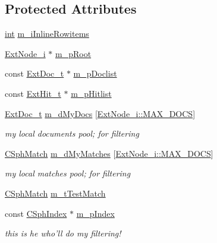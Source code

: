 \subsection*{Protected Attributes}
\begin{DoxyCompactItemize}
\item 
\hyperlink{sphinxexpr_8cpp_a4a26e8f9cb8b736e0c4cbf4d16de985e}{int} \hyperlink{classExtRanker__c_afd1de3f31fb68a71df3c6f3320943ce9}{m\-\_\-i\-Inline\-Rowitems}
\item 
\hyperlink{classExtNode__i}{Ext\-Node\-\_\-i} $\ast$ \hyperlink{classExtRanker__c_a61e8fecdc5c1fce2a4fef58063f846bc}{m\-\_\-p\-Root}
\item 
const \hyperlink{structExtDoc__t}{Ext\-Doc\-\_\-t} $\ast$ \hyperlink{classExtRanker__c_a67c930e6af375b63ab1d12fa0b85df2f}{m\-\_\-p\-Doclist}
\item 
const \hyperlink{structExtHit__t}{Ext\-Hit\-\_\-t} $\ast$ \hyperlink{classExtRanker__c_ac2cd03cfdafd11a55dd190eed8c2b84a}{m\-\_\-p\-Hitlist}
\item 
\hyperlink{structExtDoc__t}{Ext\-Doc\-\_\-t} \hyperlink{classExtRanker__c_ac099a844b02367ca2ed04916d6041372}{m\-\_\-d\-My\-Docs} \mbox{[}\hyperlink{classExtNode__i_afe46dd6ff6757d7a0bf3318fd1462bf9}{Ext\-Node\-\_\-i\-::\-M\-A\-X\-\_\-\-D\-O\-C\-S}\mbox{]}
\begin{DoxyCompactList}\small\item\em my local documents pool; for filtering \end{DoxyCompactList}\item 
\hyperlink{classCSphMatch}{C\-Sph\-Match} \hyperlink{classExtRanker__c_a1392b68deaa7087016c178505864dc89}{m\-\_\-d\-My\-Matches} \mbox{[}\hyperlink{classExtNode__i_afe46dd6ff6757d7a0bf3318fd1462bf9}{Ext\-Node\-\_\-i\-::\-M\-A\-X\-\_\-\-D\-O\-C\-S}\mbox{]}
\begin{DoxyCompactList}\small\item\em my local matches pool; for filtering \end{DoxyCompactList}\item 
\hyperlink{classCSphMatch}{C\-Sph\-Match} \hyperlink{classExtRanker__c_adb2e4ad49ca02cbd256c2be47a3a5301}{m\-\_\-t\-Test\-Match}
\item 
const \hyperlink{classCSphIndex}{C\-Sph\-Index} $\ast$ \hyperlink{classExtRanker__c_a1f6301027d451cadc539f37194fb1fef}{m\-\_\-p\-Index}
\begin{DoxyCompactList}\small\item\em this is he who'll do my filtering! \end{DoxyCompactList}\item 

\end{DoxyCompactItemize}
